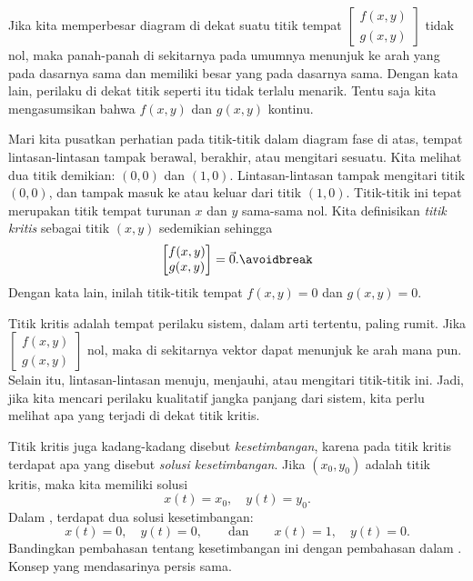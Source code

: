 Jika kita memperbesar diagram di dekat suatu titik tempat
$\left[ \begin{smallmatrix} f(x,y) \\ g(x,y) \end{smallmatrix} \right]$
tidak nol, maka panah-panah di sekitarnya pada umumnya menunjuk ke arah yang pada dasarnya sama
dan memiliki besar yang pada dasarnya sama.
Dengan kata lain, perilaku di dekat titik seperti itu tidak terlalu menarik.
Tentu saja kita mengasumsikan bahwa $f(x,y)$ dan $g(x,y)$ kontinu.

Mari kita pusatkan perhatian pada titik-titik dalam diagram fase
di atas, tempat lintasan-lintasan
tampak berawal, berakhir, atau mengitari sesuatu. Kita melihat dua titik demikian:
$(0,0)$ dan $(1,0)$. Lintasan-lintasan tampak mengitari titik $(0,0)$,
dan tampak masuk ke atau keluar dari titik $(1,0)$.
%
Titik-titik ini tepat merupakan titik tempat turunan $x$
dan $y$ sama-sama nol. Kita definisikan \emph{titik kritis}
sebagai titik $(x,y)$ sedemikian sehingga
\begin{equation*} 
\begin{bmatrix} f(x,y) \\ g(x,y) \end{bmatrix} = \vec{0} .
\avoidbreak
\end{equation*}
Dengan kata lain, inilah titik-titik tempat $f(x,y)=0$ dan $g(x,y)=0$.

Titik kritis adalah tempat perilaku sistem, dalam arti tertentu,
paling rumit. Jika
$\left[ \begin{smallmatrix} f(x,y) \\ g(x,y) \end{smallmatrix} \right]$
nol, maka di sekitarnya vektor dapat menunjuk ke arah mana pun.
Selain itu, lintasan-lintasan menuju, menjauhi, atau mengitari
titik-titik ini. Jadi, jika kita mencari perilaku kualitatif jangka panjang dari sistem,
kita perlu melihat apa yang terjadi di dekat titik kritis.

Titik kritis juga kadang-kadang disebut
\emph{kesetimbangan}, karena pada titik kritis terdapat apa yang disebut
\emph{solusi kesetimbangan}.
Jika $(x_0,y_0)$ adalah titik kritis, maka kita memiliki solusi
\begin{equation*}
x(t) = x_0, \quad y(t) = y_0 .
\end{equation*}
Dalam , terdapat dua solusi
kesetimbangan:
\begin{equation*}
x(t) = 0, \quad y(t) = 0,
\qquad \text{dan} \qquad
x(t) = 1, \quad y(t) = 0.
\end{equation*}
Bandingkan pembahasan tentang kesetimbangan ini dengan pembahasan dalam
. Konsep yang mendasarinya
persis sama.

